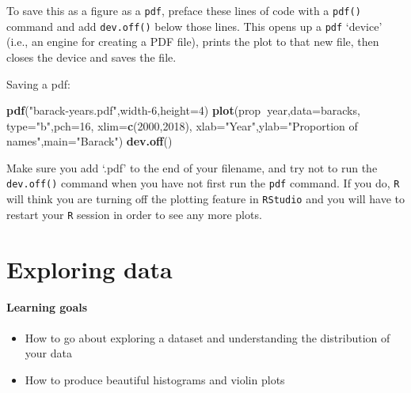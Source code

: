 \documentclass[
]{book}
\newenvironment{Shaded}{\begin{snugshade}}{\end{snugshade}}
\newcommand{\DataTypeTok}[1]{\textcolor[rgb]{0.13,0.29,0.53}{#1}}
\newcommand{\DecValTok}[1]{\textcolor[rgb]{0.00,0.00,0.81}{#1}}
\newcommand{\KeywordTok}[1]{\textcolor[rgb]{0.13,0.29,0.53}{\textbf{#1}}}
\newcommand{\NormalTok}[1]{#1}
\newcommand{\OperatorTok}[1]{\textcolor[rgb]{0.81,0.36,0.00}{\textbf{#1}}}
\newcommand{\StringTok}[1]{\textcolor[rgb]{0.31,0.60,0.02}{#1}}
\providecommand{\tightlist}{%
  \setlength{\itemsep}{0pt}\setlength{\parskip}{0pt}}
\begin{document}
To save this as a figure as a \texttt{pdf}, preface these lines of code with a \texttt{pdf()} command and add \texttt{dev.off()} below those lines. This opens up a \texttt{pdf} `device' (i.e., an engine for creating a PDF file), prints the plot to that new file, then closes the device and saves the file.

Saving a pdf:

\begin{Shaded}
\begin{Highlighting}[]
\KeywordTok{pdf}\NormalTok{(}\StringTok{"barack-years.pdf"}\NormalTok{,width}\DecValTok{-6}\NormalTok{,}\DataTypeTok{height=}\DecValTok{4}\NormalTok{)}
\KeywordTok{plot}\NormalTok{(prop}\OperatorTok{~}\NormalTok{year,}\DataTypeTok{data=}\NormalTok{baracks,}
     \DataTypeTok{type=}\StringTok{"b"}\NormalTok{,}\DataTypeTok{pch=}\DecValTok{16}\NormalTok{,}
     \DataTypeTok{xlim=}\KeywordTok{c}\NormalTok{(}\DecValTok{2000}\NormalTok{,}\DecValTok{2018}\NormalTok{),}
     \DataTypeTok{xlab=}\StringTok{"Year"}\NormalTok{,}\DataTypeTok{ylab=}\StringTok{"Proportion of names"}\NormalTok{,}\DataTypeTok{main=}\StringTok{"Barack"}\NormalTok{)}
\KeywordTok{dev.off}\NormalTok{()}
\end{Highlighting}
\end{Shaded}

Make sure you add `.pdf' to the end of your filename, and try not to run the \texttt{dev.off()} command when you have not first run the \texttt{pdf} command. If you do, \texttt{R} will think you are turning off the plotting feature in \texttt{RStudio} and you will have to restart your \texttt{R} session in order to see any more plots.

\hypertarget{exploring-data}{%
\chapter{Exploring data}\label{exploring-data}}

\hypertarget{learning-goals-12}{%
\subsubsection*{Learning goals}\label{learning-goals-12}}

\begin{itemize}
\tightlist
\item
  How to go about exploring a dataset and understanding the distribution of your data\\
\item
  How to produce beautiful histograms and violin plots
\end{itemize}
\end{document}
